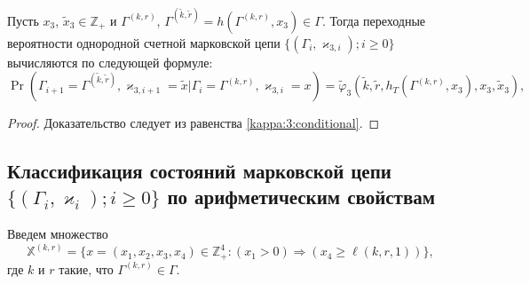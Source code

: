 \documentclass[a4paper,12pt,russian]{extarticle}
\newcommand{\Mark}{\{(\Gamma_i, \varkappa_i); i \geqslant 0\}}
\newcommand{\MarkThree}{\{(\Gamma_i, \varkappa_{3,i}); i \geqslant 0\}}
\begin{document}
\begin{theorem}
Пусть $x_3$, $\tilde{x}_3\in \mathbb{Z}_+$ и $\Gamma^{(k,r)}$, $\Gamma^{(\tilde{k},\tilde{r})}=h(\Gamma^{(k,r)},x_3) \in \Gamma$. Тогда переходные вероятности однородной счетной марковской цепи $\MarkThree$ вычисляются по следующей формуле:
\begin{equation}
\Pr (\Gamma_{i+1}=\Gamma^{(\tilde{k},\tilde{r})},\varkappa_{3,i+1}=\tilde{x}|\Gamma_{i}=\Gamma^{(k,r)},\varkappa_{3,i}=x) 
= \widetilde{\varphi}_3(\tilde{k},\tilde{r},h_T(\Gamma^{(k,r)},x_3),x_3,\tilde{x}_3),
\label{transitionToProve:three}
\end{equation}
\end{theorem}
\begin{proof}
Доказательство следует из равенства \eqref{kappa:3:conditional}.
\end{proof}
\subsection{Классификация состояний марковской цепи $\Mark$ по арифметическим свойствам}
Введем множество 
\begin{equation*}
{\mathbb X}^{(k,r)} = \{x = (x_1,x_2,x_3,x_4) \in \mathbb{Z}_+^4 \colon (x_1 > 0) \Rightarrow (x_4 \geqslant \ell(k,r,1))\},
\end{equation*}
где $k$ и $r$ такие, что $\Gamma^{(k,r)}\in \Gamma$. 
\end{document}
